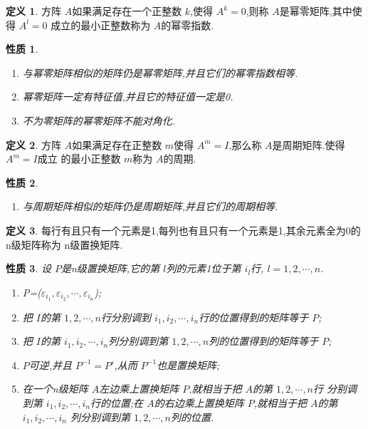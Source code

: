 \documentclass[a4paper,11pt]{article}%
\theoremstyle{remark}
\theoremstyle{definition}
\theoremstyle{definition}
\newtheorem*{definition}{定义}
\theoremstyle{plain}
\newtheorem*{property}{性质}
\begin{document}
\begin{definition}
    方阵 $A$如果满足存在一个正整数 $k$,使得 $A^k=0$,则称 $A$是幂零矩阵,其中使得 $A^l=0$
    成立的最小正整数称为 $A$的幂零指数.
\end{definition}
\begin{property}
    \begin{enumerate}
        \item 与幂零矩阵相似的矩阵仍是幂零矩阵,并且它们的幂零指数相等.
        \item 幂零矩阵一定有特征值,并且它的特征值一定是0.
        \item 不为零矩阵的幂零矩阵不能对角化.
    \end{enumerate}
\end{property}
\begin{definition}
    方阵 $A$如果满足存在正整数 $m$使得 $A^m=I$,那么称 $A$是周期矩阵.使得 $A^m=I$成立
    的最小正整数 $m$称为 $A$的周期.
\end{definition}
\begin{property}
    \begin{enumerate}
        \item 与周期矩阵相似的矩阵仍是周期矩阵,并且它们的周期相等.
    \end{enumerate}
\end{property}
\begin{definition}
    每行有且只有一个元素是1,每列也有且只有一个元素是1,其余元素全为0的n级矩阵称为
    n级置换矩阵.
\end{definition}
\begin{property}
    设 $P$是n级置换矩阵,它的第 $l$列的元素1位于第 $i_l$行, $l=1,2,\cdots,n$.
    \begin{enumerate}
        \item P=($\varepsilon_{i_1} ,\varepsilon_{i_2} ,\cdots,\varepsilon_{i_n}$);
        \item 把 $I$的第 $1,2,\cdots,n$行分别调到 $i_1,i_2,\cdots,i_n$行的位置得到的矩阵等于 $P$;
        \item 把 $I$的第 $i_1,i_2,\cdots,i_n$列分别调到第 $1,2,\cdots,n$列的位置得到的矩阵等于 $P$;
        \item $P$可逆,并且 $P^{-1}=P'$,从而 $P^{-1}$也是置换矩阵;
        \item 在一个n级矩阵 $A$左边乘上置换矩阵 $P$,就相当于把 $A$的第 $1,2,\cdots,n$行
        分别调到第 $i_1,i_2,\cdots,i_n$行的位置;在 $A$的右边乘上置换矩阵 $P$,就相当于把 $A$的第 $i_1,i_2,\cdots,i_n$
        列分别调到第 $1,2,\cdots,n$列的位置.
    \end{enumerate}
\end{property}
\end{document}
